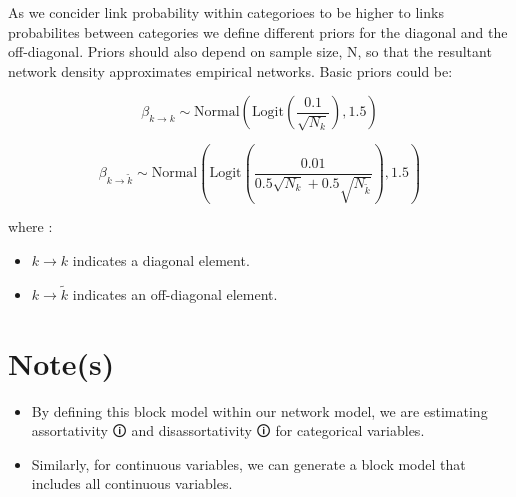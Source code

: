 \documentclass[
  letterpaper,
  DIV=11,
  numbers=noendperiod]{scrreprt}
\providecommand{\tightlist}{%
  \setlength{\itemsep}{0pt}\setlength{\parskip}{0pt}}\usepackage{longtable,booktabs,array}
\begin{document}
As we concider link probability within categorioes to be higher to links
probabilites between categories we define different priors for the
diagonal and the off-diagonal. Priors should also depend on sample size,
N, so that the resultant network density approximates empirical
networks. Basic priors could be:

\[
\beta_{k \rightarrow k} \sim \text{Normal}\left(\text{Logit}\left(\frac{0.1}{\sqrt{N_k}}\right), 1.5\right)
\]

\[
\beta_{k \rightarrow \tilde{k}} \sim \text{Normal}\left(\text{Logit}\left(\frac{0.01}{0.5 \sqrt{N_k} + 0.5 \sqrt{N_{\tilde{k}}}}\right), 1.5\right)
\]

where :

\begin{itemize}
\tightlist
\item
  \(k \rightarrow k\) indicates a diagonal element.
\item
  \(k \rightarrow \tilde{k}\) indicates an off-diagonal element.
\end{itemize}

\section{Note(s)}\label{notes-10}

\begin{tcolorbox}[enhanced jigsaw, toptitle=1mm, opacityback=0, titlerule=0mm, breakable, bottomrule=.15mm, colframe=quarto-callout-note-color-frame, arc=.35mm, coltitle=black, left=2mm, opacitybacktitle=0.6, leftrule=.75mm, toprule=.15mm, rightrule=.15mm, bottomtitle=1mm, colbacktitle=quarto-callout-note-color!10!white, title=\textcolor{quarto-callout-note-color}{\faInfo}\hspace{0.5em}{Note}, colback=white]

\begin{itemize}
\item
  By defining this block model within our network model, we are
  estimating \label{assor}{{assortativity 🛈}} and
  \label{disassor}{{disassortativity 🛈}} for categorical
  variables.
\item
  Similarly, for continuous variables, we can generate a block model
  that includes all continuous variables.
\end{itemize}

\end{tcolorbox}

\end{document}
